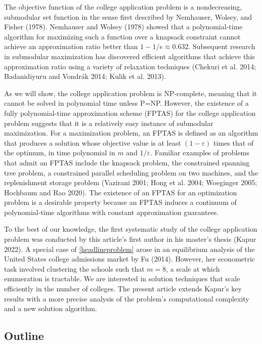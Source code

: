 \documentclass[11pt]{article} %
\theoremstyle{definition}
\begin{document}
The objective function of the college application problem is a nondecreasing, submodular set function in the sense first described by Nemhauser, Wolsey, and Fisher (1978). Nemhauser and Wolsey (1978) showed that a polynomial-time algorithm for maximizing such a function over a knapsack constraint cannot achieve an approximation ratio better than $1 - 1 / e \approx 0.632$. Subsequent research in submodular maximization has discovered efficient algorithms that achieve this approximation ratio using a variety of relaxation techniques (Chekuri et al. 2014; Badanidiyuru and Vondrák 2014; Kulik et al. 2013).

As we will show, the college application problem is NP-complete, meaning that it cannot be solved in polynomial time unless P=NP. However, the existence of a fully polynomial-time approximation scheme (FPTAS) for the college application problem suggests that it is a relatively easy instance of submodular maximization. For a maximization problem, an FPTAS is defined as an algorithm that produces a solution whose objective value is at least $(1 - \varepsilon)$ times that of the optimum, in time polynomial in $m$ and $1 / \varepsilon$. Familiar examples of problems that admit an FPTAS include the knapsack problem, the constrained spanning tree problem, a constrained parallel scheduling problem on two machines, and the replenishment storage problem (Vazirani 2001; Hong et al. 2004; Woeginger 2005; Hochbaum and Rao 2020). The existence of an FPTAS for an optimization problem is a desirable property because an FPTAS induces a continuum of polynomial-time algorithms with constant approximation guarantees.

To the best of our knowledge, the first systematic study of the college application problem was conducted by this article's first author in his master's thesis (Kapur 2022). A special case of \eqref{headlineproblem} arose in an equilibrium analysis of the United States college admissions market by Fu (2014). However, her econometric task involved clustering the schools such that $m=8$, a scale at which enumeration is tractable. We are interested in solution techniques that scale efficiently in the number of colleges. The present article extends Kapur's key results with a more precise analysis of the problem's computational complexity and a new solution algorithm.

\subsection{Outline}
\end{document}
